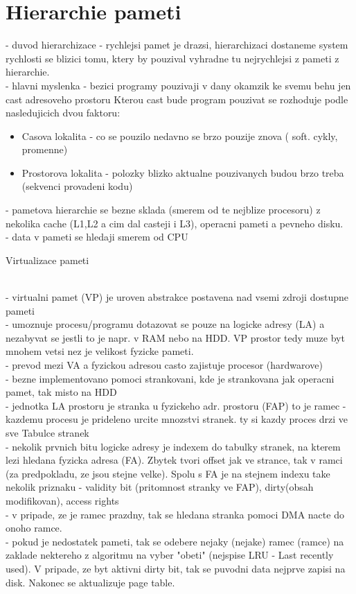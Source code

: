 \documentclass[10pt]{article}
\begin{document}
\renewcommand{\labelitemi}{$\bullet$}

\section*{Hierarchie pameti}
- duvod hierarchizace - rychlejsi pamet je drazsi, hierarchizaci dostaneme system rychlosti se blizici tomu, ktery by pouzival vyhradne tu nejrychlejsi z pameti z hierarchie.\\
- hlavni myslenka - bezici programy pouzivaji v dany okamzik ke svemu behu jen cast adresoveho prostoru
Kterou cast bude program pouzivat se rozhoduje podle nasledujicich dvou faktoru:
\begin{itemize}
\item Casova lokalita - co se pouzilo nedavno se brzo pouzije znova ( soft. cykly, promenne)
\item Prostorova lokalita - polozky blizko aktualne pouzivanych budou brzo treba (sekvenci provadeni kodu)
\end{itemize}
- pametova hierarchie se bezne sklada (smerem od te nejblize procesoru) z nekolika cache (L1,L2 a cim dal casteji i L3), operacni pameti a pevneho disku.\\
- data v pameti se hledaji smerem od CPU
\\[10pt]
\begin{large}
Virtualizace pameti
\end{large}\\[10pt]
- virtualni pamet (VP) je uroven abstrakce postavena nad vsemi zdroji dostupne pameti\\
- umoznuje procesu/programu dotazovat se pouze na logicke adresy (LA) a nezabyvat se jestli to je napr. v RAM nebo na HDD. VP prostor tedy muze byt mnohem vetsi nez je velikost fyzicke pameti.\\
- prevod mezi VA a fyzickou adresou casto zajistuje procesor (hardwarove)\\
- bezne implementovano pomoci strankovani, kde je strankovana jak operacni pamet, tak misto na HDD\\
- jednotka LA prostoru je stranka u fyzickeho adr. prostoru (FAP) to je ramec
-kazdemu procesu je prideleno urcite mnozstvi stranek. ty si kazdy proces drzi ve sve Tabulce stranek\\
- nekolik prvnich bitu logicke adresy je indexem do tabulky stranek, na kterem lezi hledana fyzicka adresa (FA). Zbytek tvori offset jak ve strance, tak v ramci (za predpokladu, ze jsou stejne velke). Spolu s FA je na stejnem indexu take nekolik priznaku - validity bit (pritomnost stranky ve FAP), dirty(obsah modifikovan), access rights\\
- v pripade, ze je ramec prazdny, tak se hledana stranka pomoci DMA nacte do onoho ramce.\\
- pokud je nedostatek pameti, tak se odebere nejaky (nejake) ramec (ramce) na zaklade nektereho z algoritmu na vyber "obeti" (nejspise LRU - Last recently used). V pripade, ze byt aktivni dirty bit, tak se puvodni data nejprve zapisi na disk. Nakonec se aktualizuje page table.
\end{document}
